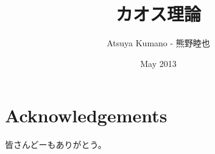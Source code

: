 \documentclass[12pt,twoside]{reedthesis}
\title{カオス理論}
\author{Atsuya Kumano - 熊野睦也}
\date{May 2013}
\begin{document}
\maketitle
\frontmatter %
\pagestyle{empty} %

\chapter*{Acknowledgements}
皆さんどーもありがとう。

\tableofcontents


\mainmatter %
\pagestyle{fancyplain} %




















\appendix




\backmatter %

\renewcommand{\bibname}{References}

\nocite{*}

  
\printindex
\end{document}
